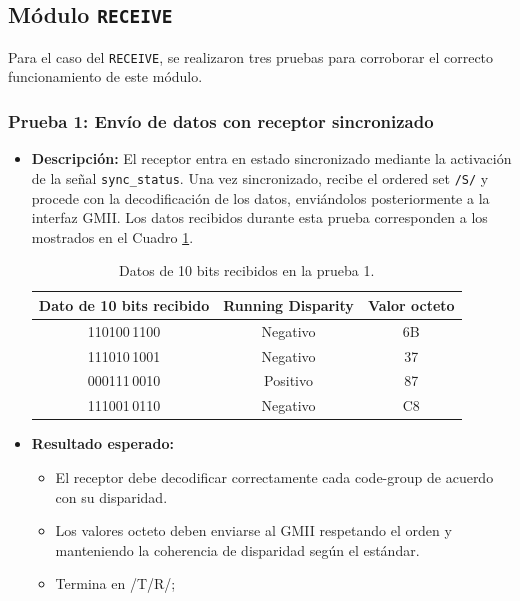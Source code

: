 \subsection{Módulo \texttt{RECEIVE}}

Para el caso del \texttt{RECEIVE}, se realizaron tres pruebas para corroborar el correcto funcionamiento de este módulo.

\subsubsection*{Prueba 1: Envío de datos con receptor sincronizado}

\begin{itemize}
  \item \textbf{Descripción:}  
    El receptor entra en estado sincronizado mediante la activación de la señal \texttt{sync\_status}.  
    Una vez sincronizado, recibe el ordered set \texttt{/S/} y procede con la decodificación de los datos, enviándolos posteriormente a la interfaz GMII.  
    Los datos recibidos durante esta prueba corresponden a los mostrados en el Cuadro \ref{prueba1_receive}.

    \begin{table}[H]
        \centering
        \begin{tabular}{ccc}
        \hline
            Dato de 10 bits recibido & Running Disparity & Valor octeto\\ \hline
             110100\,1100 & Negativo & 6B\\
             111010\,1001 & Negativo & 37\\ 
             000111\,0010 & Positivo & 87\\ 
             111001\,0110 & Negativo & C8\\ \hline
        \end{tabular}
        \caption{Datos de 10 bits recibidos en la prueba 1.}
        \label{prueba1_receive}
    \end{table}

  \item \textbf{Resultado esperado:}
    \begin{itemize}
      \item El receptor debe decodificar correctamente cada code-group de acuerdo con su disparidad.
      \item Los valores octeto deben enviarse al GMII respetando el orden y manteniendo la coherencia de disparidad según el estándar.
      \item Termina en /T/R/;
    \end{itemize}
\end{itemize}

